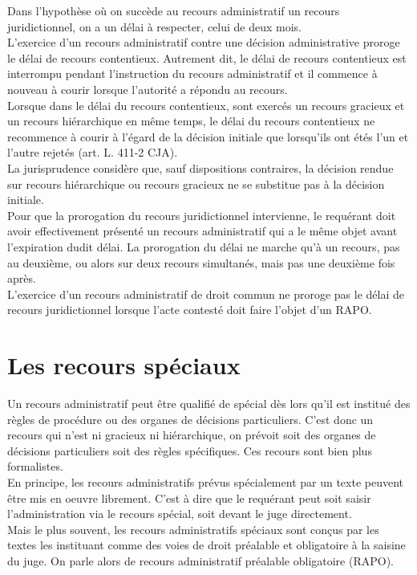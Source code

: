 \documentclass[10pt, a4paper, openany]{book}
\begin{document}
Dans l'hypothèse où on succède au recours administratif un recours juridictionnel, on a un délai à respecter, celui de deux mois. \\
L'exercice d'un recours administratif contre une décision administrative proroge le délai de recours contentieux. Autrement dit, le délai de recours contentieux est interrompu pendant l'instruction du recours administratif et il commence à nouveau à courir lorsque l'autorité a répondu au recours. \\
Lorsque dans le délai du recours contentieux, sont exercés un recours gracieux et un recours hiérarchique en même temps, le délai du recours contentieux ne recommence à courir à l'égard de la décision initiale que lorsqu'ils ont étés l'un et l'autre rejetés (art. L. 411-2 CJA). \\
La jurisprudence considère que, sauf dispositions contraires, la décision rendue sur recours hiérarchique ou recours gracieux ne se substitue pas à la décision initiale. \\
Pour que la prorogation du recours juridictionnel intervienne, le requérant doit avoir effectivement présenté un recours administratif qui a le même objet avant l'expiration dudit délai. La prorogation du délai ne marche qu'à un recours, pas au deuxième, ou alors sur deux recours simultanés, mais pas une deuxième fois après. \\
L'exercice d'un recours administratif de droit commun ne proroge pas le délai de recours juridictionnel lorsque l'acte contesté doit faire l'objet d'un RAPO. 

\section{Les recours spéciaux}

Un recours administratif peut être qualifié de spécial dès lors qu'il est institué des règles de procédure ou des organes de décisions particuliers. C'est donc un recours qui n'est ni gracieux ni hiérarchique, on prévoit soit des organes de décisions particuliers soit des règles spécifiques. Ces recours sont bien plus formalistes. \\
En principe, les recours administratifs prévus spécialement par un texte peuvent être mis en oeuvre librement. C'est à dire que le requérant peut soit saisir l'administration via le recours spécial, soit devant le juge directement. \\
Mais le plus souvent, les recours administratifs spéciaux sont conçus par les textes les instituant comme des voies de droit préalable et obligatoire à la saisine du juge. On parle alors de recours administratif préalable obligatoire (RAPO). 
\end{document}
